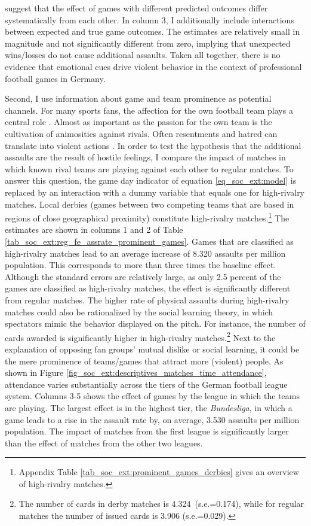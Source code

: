suggest that the effect of games with different predicted outcomes differ systematically from each other. In column 3, I additionally include interactions between expected and true game outcomes. The estimates are relatively small in magnitude and not significantly different from zero, implying that unexpected wins/losses do not cause additional assaults. Taken all together, there is no evidence that emotional cues drive violent behavior in the context of professional football games in Germany.





Second, I use information about game and team prominence as potential channels. For many sports fans, the affection for the own football team plays a central role \citep{wann1993sports}. Almost as important as the passion for the own team is the cultivation of animosities against rivals. Often resentments and hatred can translate into violent actions \citep{nassauer2011hate}. In order to test the hypothesis that the additional assaults are the result of hostile feelings, I compare the impact of matches in which known rival teams are playing against each other to regular matches. To answer this question, the game day indicator of equation \ref{eq_soc_ext:model} is replaced by an interaction with a dummy variable that equals one for high-rivalry matches. Local derbies (games between two competing teams that are based in regions of close geographical proximity) constitute high-rivalry matches.\footnote{Appendix Table \ref{tab_soc_ext:prominent_games_derbies} gives an overview of high-rivalry matches.} The estimates are shown in columns 1 and 2 of Table \ref{tab_soc_ext:reg_fe_assrate_prominent_games}. Games that are classified as high-rivalry matches lead to an average increase of 8.320 assaults per million population. This corresponds to more than three times the baseline effect. Although the standard errors are relatively large, as only 2.5 percent of the games are classified as high-rivalry matches, the effect is significantly different from regular matches. The higher rate of physical assaults during high-rivalry matches could also be rationalized by the social learning theory, in which spectators mimic the behavior displayed on the pitch. For instance, the number of cards awarded is significantly higher in high-rivalry matches.\footnote{The number of cards in derby matches is 4.324\ (s.e.=0.174), while for regular matches the number of issued cards is 3.906 (s.e.=0.029).} Next to the explanation of opposing fan groups' mutual dislike or social learning, it could be the mere prominence of teams/games that attract more (violent) people. As shown in Figure \ref{fig_soc_ext:descriptives_matches_time_attendance}, attendance varies substantially across the tiers of the German football league system. Columns 3-5 shows the effect of games by the league in which the teams are playing. The largest effect is in the highest tier, the \textit{Bundesliga}, in which a game leads to a rise in the assault rate by, on average, 3.530 assaults per million population. The impact of matches from the first league is significantly larger than the effect of matches from the other two leagues.
